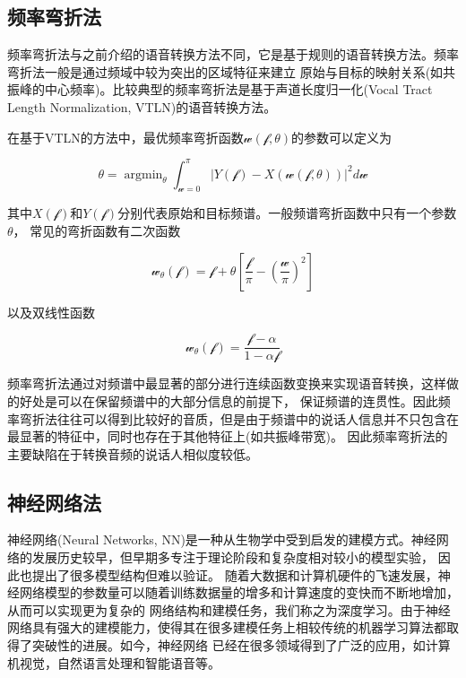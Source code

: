 \subsection{频率弯折法}
频率弯折法与之前介绍的语音转换方法不同，它是基于规则的语音转换方法。频率弯折法一般是通过频域中较为突出的区域特征来建立
原始与目标的映射关系(如共振峰的中心频率)。比较典型的频率弯折法是基于声道长度归一化(Vocal Tract Length Normalization, VTLN)的语音转换方法。

在基于VTLN的方法中，最优频率弯折函数$\mathcal{w}(\mathcal{f}, \theta)$的参数可以定义为

\begin{equation}
    \theta = \mathop{\arg\min}_{\theta}\int^{\pi}_{\mathcal{w}=0}\left| Y(\mathcal{f})-X(\mathcal{w}(\mathcal{f},\theta)) \right|^2 d\mathcal{w}
\end{equation}

其中$X(\mathcal{f})$和$Y(\mathcal{f})$分别代表原始和目标频谱。一般频谱弯折函数中只有一个参数$\theta$，
常见的弯折函数有二次函数

\begin{equation}
    \mathcal{w}_{\theta}(\mathcal{f}) = \mathcal{f} + \theta\left[ \frac{\mathcal{f}}{\pi}-(\frac{\mathcal{w}}{\pi})^2 \right]  
\end{equation}

以及双线性函数

\begin{equation}
    \mathcal{w}_{\theta}(\mathcal{f}) = \frac{\mathcal{f}-\alpha}{1-\alpha \mathcal{f}}
\end{equation}

频率弯折法通过对频谱中最显著的部分进行连续函数变换来实现语音转换，这样做的好处是可以在保留频谱中的大部分信息的前提下，
保证频谱的连贯性。因此频率弯折法往往可以得到比较好的音质，但是由于频谱中的说话人信息并不只包含在最显著的特征中，同时也存在于其他特征上(如共振峰带宽)。
因此频率弯折法的主要缺陷在于转换音频的说话人相似度较低。

\subsection{神经网络法}
神经网络(Neural Networks, NN)是一种从生物学中受到启发的建模方式。神经网络的发展历史较早，但早期多专注于理论阶段和复杂度相对较小的模型实验，
因此也提出了很多模型结构但难以验证。
随着大数据和计算机硬件的飞速发展，神经网络模型的参数量可以随着训练数据量的增多和计算速度的变快而不断地增加，从而可以实现更为复杂的
网络结构和建模任务，我们称之为深度学习。由于神经网络具有强大的建模能力，使得其在很多建模任务上相较传统的机器学习算法都取得了突破性的进展。如今，神经网络
已经在很多领域得到了广泛的应用，如计算机视觉，自然语言处理和智能语音等。

